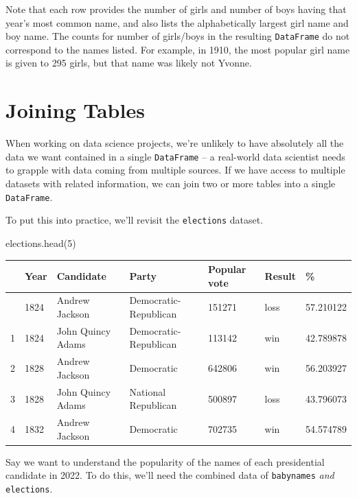 \documentclass[
  letterpaper,
  DIV=11,
  numbers=noendperiod]{scrreprt}
\newenvironment{Shaded}{\begin{snugshade}}{\end{snugshade}}
\newcommand{\DecValTok}[1]{\textcolor[rgb]{0.68,0.00,0.00}{#1}}
\newcommand{\NormalTok}[1]{\textcolor[rgb]{0.00,0.23,0.31}{#1}}
\begin{document}
Note that each row provides the number of girls and number of boys
having that year's most common name, and also lists the alphabetically
largest girl name and boy name. The counts for number of girls/boys in
the resulting \texttt{DataFrame} do not correspond to the names listed.
For example, in 1910, the most popular girl name is given to 295 girls,
but that name was likely not Yvonne.

\section{Joining Tables}\label{joining-tables}

When working on data science projects, we're unlikely to have absolutely
all the data we want contained in a single \texttt{DataFrame} -- a
real-world data scientist needs to grapple with data coming from
multiple sources. If we have access to multiple datasets with related
information, we can join two or more tables into a single
\texttt{DataFrame}.

To put this into practice, we'll revisit the \texttt{elections} dataset.

\begin{Shaded}
\begin{Highlighting}[]
\NormalTok{elections.head(}\DecValTok{5}\NormalTok{)}
\end{Highlighting}
\end{Shaded}

\begin{longtable}[]{@{}lllllll@{}}
\toprule\noalign{}
& Year & Candidate & Party & Popular vote & Result & \% \\
\midrule\noalign{}
\endhead
\bottomrule\noalign{}
\endlastfoot
0 & 1824 & Andrew Jackson & Democratic-Republican & 151271 & loss &
57.210122 \\
1 & 1824 & John Quincy Adams & Democratic-Republican & 113142 & win &
42.789878 \\
2 & 1828 & Andrew Jackson & Democratic & 642806 & win & 56.203927 \\
3 & 1828 & John Quincy Adams & National Republican & 500897 & loss &
43.796073 \\
4 & 1832 & Andrew Jackson & Democratic & 702735 & win & 54.574789 \\
\end{longtable}

Say we want to understand the popularity of the names of each
presidential candidate in 2022. To do this, we'll need the combined data
of \texttt{babynames} \emph{and} \texttt{elections}.
\end{document}
